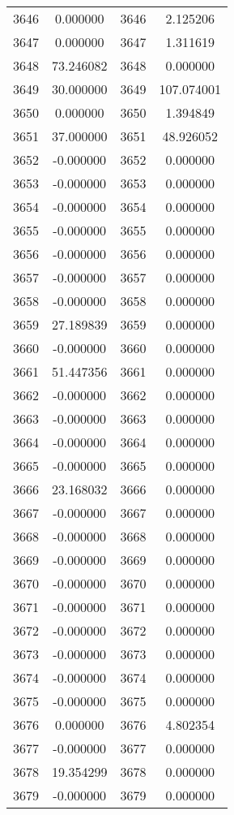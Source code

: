 \documentclass[12pt]{article}
\begin{document}
\begin{longtable}{@{}cccc@{}}
3646 & 0.000000 & 3646 & 2.125206 \\
3647 & 0.000000 & 3647 & 1.311619 \\
3648 & 73.246082 & 3648 & 0.000000 \\
3649 & 30.000000 & 3649 & 107.074001 \\
3650 & 0.000000 & 3650 & 1.394849 \\
3651 & 37.000000 & 3651 & 48.926052 \\
3652 & -0.000000 & 3652 & 0.000000 \\
3653 & -0.000000 & 3653 & 0.000000 \\
3654 & -0.000000 & 3654 & 0.000000 \\
3655 & -0.000000 & 3655 & 0.000000 \\
3656 & -0.000000 & 3656 & 0.000000 \\
3657 & -0.000000 & 3657 & 0.000000 \\
3658 & -0.000000 & 3658 & 0.000000 \\
3659 & 27.189839 & 3659 & 0.000000 \\
3660 & -0.000000 & 3660 & 0.000000 \\
3661 & 51.447356 & 3661 & 0.000000 \\
3662 & -0.000000 & 3662 & 0.000000 \\
3663 & -0.000000 & 3663 & 0.000000 \\
3664 & -0.000000 & 3664 & 0.000000 \\
3665 & -0.000000 & 3665 & 0.000000 \\
3666 & 23.168032 & 3666 & 0.000000 \\
3667 & -0.000000 & 3667 & 0.000000 \\
3668 & -0.000000 & 3668 & 0.000000 \\
3669 & -0.000000 & 3669 & 0.000000 \\
3670 & -0.000000 & 3670 & 0.000000 \\
3671 & -0.000000 & 3671 & 0.000000 \\
3672 & -0.000000 & 3672 & 0.000000 \\
3673 & -0.000000 & 3673 & 0.000000 \\
3674 & -0.000000 & 3674 & 0.000000 \\
3675 & -0.000000 & 3675 & 0.000000 \\
3676 & 0.000000 & 3676 & 4.802354 \\
3677 & -0.000000 & 3677 & 0.000000 \\
3678 & 19.354299 & 3678 & 0.000000 \\
3679 & -0.000000 & 3679 & 0.000000 \\

\end{longtable}
\end{document}
